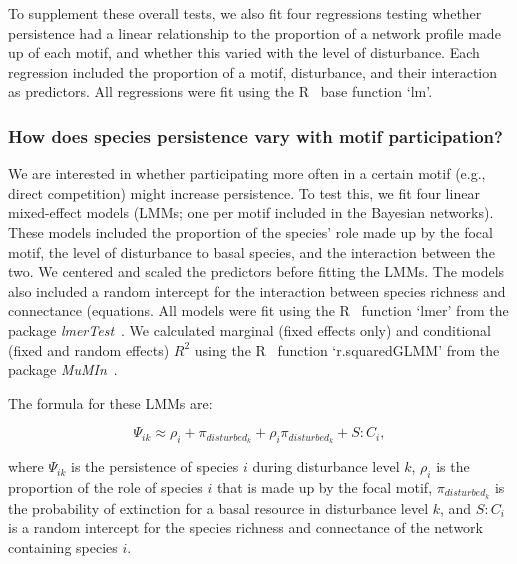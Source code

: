 \documentclass[12pt]{article}
\begin{document}
\begin{spacing}{2.0}
            
            To supplement these overall tests, we also fit four regressions testing whether persistence had a linear relationship to the proportion of a network profile made up of each motif, and whether this varied with the level of disturbance.
            Each regression included the proportion of a motif, disturbance, and their interaction as predictors.
            All regressions were fit using the R~\citep{R} base function `lm'.
        
        
        \subsubsection*{How does species persistence vary with motif participation?}

            We are interested in whether participating more often in a certain motif (e.g., direct competition) might increase persistence.
            To test this, we fit four linear mixed-effect models (LMMs; one per motif included in the Bayesian networks).
            These models included the proportion of the species' role made up by the focal motif, the level of disturbance to basal species, and the interaction between the two.
            We centered and scaled the predictors before fitting the LMMs.
            The models also included a random intercept for the interaction between species richness and connectance (equations.
            All models were fit using the R~\citep{R} function `lmer' from the package \emph{lmerTest}~\citep{lmerTest}.
            We calculated marginal (fixed effects only) and conditional (fixed and random effects) $R^2$ using the R~\citep{R} function `r.squaredGLMM' from the package \emph{MuMIn}~\citep{MuMIn}.

            The formula for these LMMs are:       
            
            \begin{equation}
                \Psi_{ik} \approx \rho_{i} + \pi_{disturbed_k} + \rho_{i}\pi_{disturbed_k} +
                S:C_{i} ,
                \label{propreq}
            \end{equation}


            where $\Psi_{ik}$ is the persistence of species $i$ during disturbance level $k$, $\rho_{i}$ is the proportion of the role of species $i$ that is made up by the focal motif, $\pi_{disturbed_k}$ is the probability of extinction for a basal resource in disturbance level $k$, and $S:C_{i}$ is a random intercept for the species richness and connectance of the network containing species $i$.
    

\end{spacing}
\end{document}
